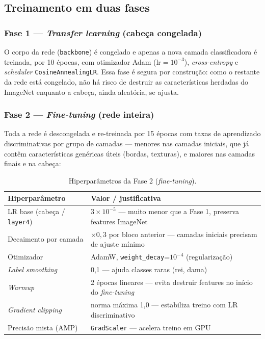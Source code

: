 \subsection{Treinamento em duas fases}

\subsubsection{Fase 1 --- \textit{Transfer learning} (cabeça congelada)}

O corpo da rede (\texttt{backbone}) é congelado e apenas a nova camada classificadora é
treinada, por 10 épocas, com otimizador Adam ($\text{lr}=10^{-3}$), \textit{cross-entropy}
e \textit{scheduler} \texttt{CosineAnnealingLR}. Essa fase é segura por construção: como
o restante da rede está congelado, não há risco de destruir as características herdadas
do ImageNet enquanto a cabeça, ainda aleatória, se ajusta.

\subsubsection{Fase 2 --- \textit{Fine-tuning} (rede inteira)}

Toda a rede é descongelada e re-treinada por 15 épocas com taxas de aprendizado
discriminativas por grupo de camadas --- menores nas camadas iniciais, que já contêm
características genéricas úteis (bordas, texturas), e maiores nas camadas finais e na
cabeça:

\begin{table}[H]
\centering
\caption{Hiperparâmetros da Fase 2 (\textit{fine-tuning}).}
\begin{tabular}{@{}ll@{}}
\toprule
Hiperparâmetro & Valor / justificativa \\
\midrule
LR base (cabeça / \texttt{layer4}) & $3\times10^{-5}$ --- muito menor que a Fase 1, preserva features ImageNet \\
Decaimento por camada & $\times 0{,}3$ por bloco anterior --- camadas iniciais precisam de ajuste mínimo \\
Otimizador & AdamW, \texttt{weight\_decay}=$10^{-4}$ (regularização) \\
\textit{Label smoothing} & 0,1 --- ajuda classes raras (rei, dama) \\
\textit{Warmup} & 2 épocas lineares --- evita destruir features no início do \textit{fine-tuning} \\
\textit{Gradient clipping} & norma máxima 1,0 --- estabiliza treino com LR discriminativo \\
Precisão mista (AMP) & \texttt{GradScaler} --- acelera treino em GPU \\
\bottomrule
\end{tabular}
\end{table}

